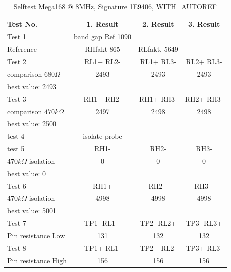 \begin{table}[H]
  \begin{center}
    \begin{tabular}{| l | c | c | c |}
    \hline
Test No. & 1. Result & 2. Result & 3. Result \\
    \hline
    \hline
Test 1 & band gap Ref  1090 &  & \\
Reference  & RHfakt 865 & RLfakt.  5649 &  \\
    \hline
Test 2 & RL1+ RL2- & RL1+ RL3- & RL2+ RL3- \\
comparison \(680\Omega\) & 2493 & 2493 & 2493 \\
best value: 2493 & & & \\
    \hline
Test 3 & RH1+ RH2- & RH1+ RH3- & RH2+ RH3- \\
comparison \(470k\Omega\) & 2497 & 2498 & 2498 \\
best value: 2500 & & & \\
    \hline
test 4 & isolate probe & & \\
    \hline
test 5 & RH1- &  RH2- & RH3- \\
\(470k\Omega\) isolation & 0 & 0 & 0 \\
best value: 0 & & & \\
    \hline
Test 6 & RH1+ & RH2+ & RH3+ \\
\(470k\Omega\) isolation & 4998 & 4998 & 4998 \\
best value: 5001 & & & \\
    \hline
Test 7 & TP1- RL1+ & TP2- RL2+ & TP3- RL3+ \\
Pin resistance Low & 131 & 132 & 132 \\
    \hline
Test 8 & TP1+ RL1- & TP2+ RL2- & TP3+ RL3- \\
Pin resistance High & 156 & 156 & 156 \\
    \hline
    \end{tabular}
  \end{center}
  \caption{Selftest Mega168 @ 8MHz, Signature 1E9406, WITH\_AUTOREF}
  \label{tab:test_m168} 
\end{table}
